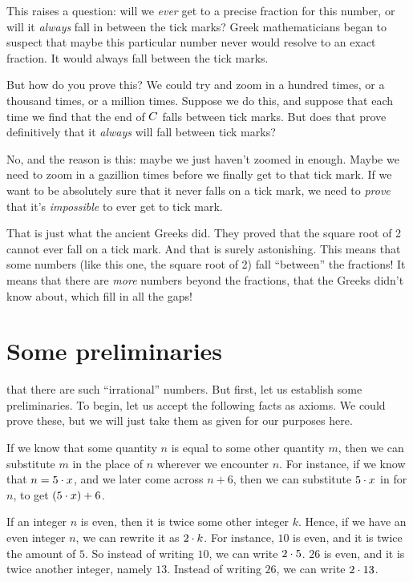 \documentclass[../../../main.tex]{subfiles}
\begin{document}
This raises a question: will we \emph{ever} get to a precise fraction for this number, or will it \emph{always} fall in between the tick marks? Greek mathematicians began to suspect that maybe this particular number never would resolve to an exact fraction. It would always fall between the tick marks.

But how do you prove this? We could try and zoom in a hundred times, or a thousand times, or a million times. Suppose we do this, and suppose that each time we find that the end of $C$ falls between tick marks. But does that prove definitively that it \emph{always} will fall between tick marks? 

No, and the reason is this: maybe we just haven't zoomed in enough. Maybe we need to zoom in a gazillion times before we finally get to that tick mark. If we want to be absolutely sure that it never falls on a tick mark, we need to \emph{prove} that it's \emph{impossible} to ever get to tick mark.

That is just what the ancient Greeks did. They proved that the square root of 2 cannot ever fall on a tick mark. And that is surely astonishing. This means that some numbers (like this one, the square root of 2) fall ``between'' the fractions! It means that there are \emph{more} numbers beyond the fractions, that the Greeks didn't know about, which fill in all the gaps!


\section{Some preliminaries}

 that there are such ``irrational'' numbers. But first, let us establish some preliminaries. To begin, let us accept the following facts as axioms. We could prove these, but we will just take them as given for our purposes here.

\begin{fact}
  \label{fact:substitution-is-allowed}
  If we know that some quantity $n$ is equal to some other quantity $m$, then we can substitute $m$ in the place of $n$ wherever we encounter $n$. For instance, if we know that $n = 5 \mult/ x$, and we later come across $n + 6$, then we can substitute $5 \mult/ x$ in for $n$, to get $(5 \mult/ x) + 6$. 
\end{fact}

\begin{fact}
  \label{fact:even-ints-definition}
  If an integer $n$ is even, then it is twice some other integer $k$. Hence, if we have an even integer $n$, we can rewrite it as $2 \mult/ k$. For instance, $10$ is even, and it is twice the amount of $5$. So instead of writing $10$, we can write $2 \mult/ 5$. $26$ is even, and it is twice another integer, namely $13$. Instead of writing $26$, we can write $2 \mult/ 13$.
\end{fact}
\end{document}
